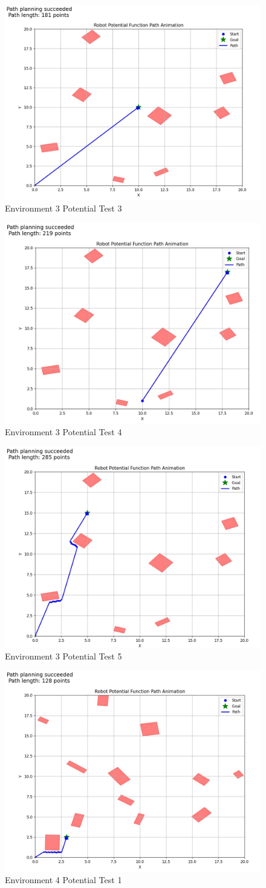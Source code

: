 \documentclass{article}
\begin{document}
\begin{figure} [H]
    \centering
    \includegraphics[width=0.5\linewidth]{latex_media/Env3PotentialTest3.jpg}
    \caption{Environment 3 Potential Test 3}
\end{figure}

\begin{figure} [H]
    \centering
    \includegraphics[width=0.5\linewidth]{latex_media/Env3PotentialTest4.jpg}
    \caption{Environment 3 Potential Test 4}
\end{figure}

\begin{figure} [H]
    \centering
    \includegraphics[width=0.5\linewidth]{latex_media/Env3PotentialTest5.jpg}
    \caption{Environment 3 Potential Test 5}
\end{figure}

\begin{figure} [H]
    \centering
    \includegraphics[width=0.5\linewidth]{latex_media/Env4PotentialTest1.jpg}
    \caption{Environment 4 Potential Test 1}
\end{figure}
\end{document}
